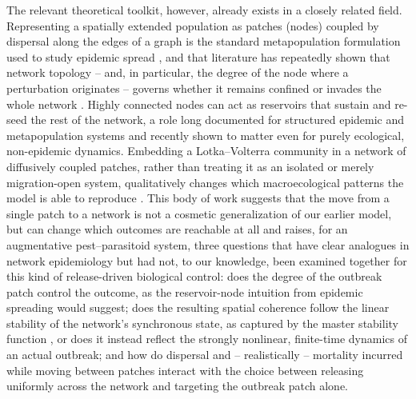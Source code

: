 The relevant theoretical toolkit, however, already exists in a closely related field. Representing a spatially extended population as patches (nodes) coupled by dispersal along the edges of a graph is the standard metapopulation formulation used to study epidemic spread \citep{PastorSatorras2001,Colizza2007}, and that literature has repeatedly shown that network topology -- and, in particular, the degree of the node where a perturbation originates -- governs whether it remains confined or invades the whole network \citep{Colizza2007}. Highly connected nodes can act as reservoirs that sustain and re-seed the rest of the network, a role long documented for structured epidemic and metapopulation systems \citep{Colizza2007} and recently shown to matter even for purely ecological, non-epidemic dynamics. Embedding a Lotka--Volterra
community in a network of diffusively coupled patches, rather than treating it as an isolated or merely migration-open system, qualitatively changes which macroecological patterns the model is
able to reproduce \citep{GutierrezArroyo2026}. This body of work suggests that the move from a single patch to a network is not a cosmetic generalization of our earlier model, but can change which outcomes are reachable at all and raises, for an augmentative pest--parasitoid system, three questions that have clear analogues in network epidemiology but had not, to our knowledge, been examined together for this kind of release-driven biological control: does the degree of the outbreak patch control the outcome, as the reservoir-node intuition from epidemic spreading would suggest; does the resulting spatial coherence follow the linear stability of the network's synchronous state, as captured by the master stability function \citep{pecora1998}, or does it instead reflect the strongly nonlinear, finite-time dynamics of an actual outbreak; and how do dispersal and -- realistically -- mortality incurred while moving between patches interact with the choice between releasing uniformly across the network and targeting the outbreak patch alone.

